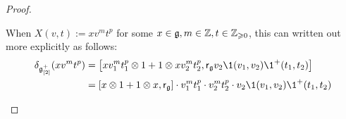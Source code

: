 \begin{proof}
\begin{enumerate}
                        When $X(v, t) := x v^m t^p$ for some $x \in \mathfrak{g}, m \in \mathbb{Z}, t \in \mathbb{Z}_{\geqslant 0}$, this can written out more explicitly as follows:
                            $$
                                \begin{aligned}
                                    \delta_{\g_{[2]}^+}( x v^m t^p ) & = \left[x v_1^m t_1^p \tensor 1 + 1 \tensor x v_2^m t_2^p, \sfr_{\g} v_2 \1(v_1, v_2) \1^+(t_1, t_2)\right]
                                    \\
                                    & = [x \tensor 1 + 1 \tensor x, \sfr_{\g}] \cdot v_1^m t_1^p \cdot v_2^m t_2^p \cdot v_2 \1(v_1, v_2) \1^+(t_1, t_2)
                                \end{aligned}
                            $$
                    \end{enumerate}
                \end{proof}

